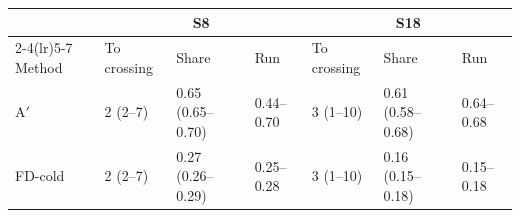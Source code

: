 \begin{tabular}{lllllll}\toprule
 & \multicolumn{3}{c}{S8} & \multicolumn{3}{c}{S18}\\\cmidrule(lr){2-4}\cmidrule(lr){5-7}
Method & To crossing & Share & Run & To crossing & Share & Run\\\midrule
A$'$ & 2 (2--7) & 0.65 (0.65--0.70) & 0.44--0.70 & 3 (1--10) & 0.61 (0.58--0.68) & 0.64--0.68\\
FD-cold & 2 (2--7) & 0.27 (0.26--0.29) & 0.25--0.28 & 3 (1--10) & 0.16 (0.15--0.18) & 0.15--0.18\\
\bottomrule\end{tabular}
